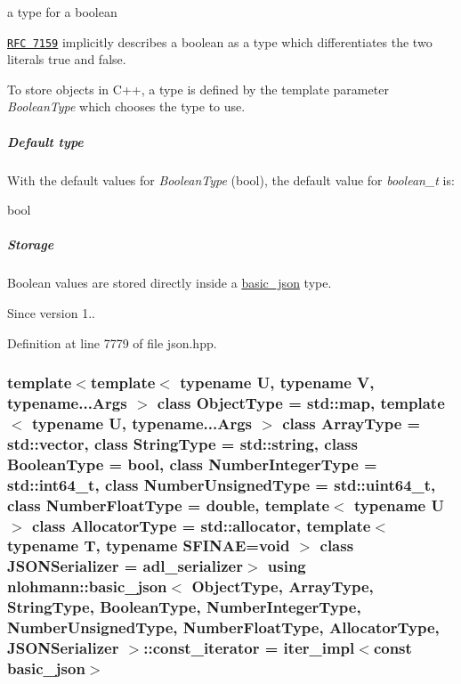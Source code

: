 a type for a boolean 

\href{http://rfc7159.net/rfc7159}{\tt R\+FC 7159} implicitly describes a boolean as a type which differentiates the two literals {\ttfamily true} and {\ttfamily false}.

To store objects in C++, a type is defined by the template parameter {\itshape Boolean\+Type} which chooses the type to use.

\subparagraph*{Default type}

With the default values for {\itshape Boolean\+Type} ({\ttfamily bool}), the default value for {\itshape boolean\+\_\+t} is\+:


\begin{DoxyCode}
\textcolor{keywordtype}{bool}
\end{DoxyCode}


\subparagraph*{Storage}

Boolean values are stored directly inside a \hyperlink{classnlohmann_1_1basic__json}{basic\+\_\+json} type.

\begin{DoxySince}{Since}
version 1.. 
\end{DoxySince}


Definition at line 7779 of file json.\+hpp.

\subsubsection[{\texorpdfstring{const\+\_\+iterator}{const_iterator}}]{\setlength{\rightskip}{0pt plus 5cm}template$<$template$<$ typename U, typename V, typename...\+Args $>$ class Object\+Type = std\+::map, template$<$ typename U, typename...\+Args $>$ class Array\+Type = std\+::vector, class String\+Type  = std\+::string, class Boolean\+Type  = bool, class Number\+Integer\+Type  = std\+::int64\+\_\+t, class Number\+Unsigned\+Type  = std\+::uint64\+\_\+t, class Number\+Float\+Type  = double, template$<$ typename U $>$ class Allocator\+Type = std\+::allocator, template$<$ typename T, typename S\+F\+I\+N\+A\+E=void $>$ class J\+S\+O\+N\+Serializer = adl\+\_\+serializer$>$ using {\bf nlohmann\+::basic\+\_\+json}$<$ Object\+Type, Array\+Type, String\+Type, Boolean\+Type, Number\+Integer\+Type, Number\+Unsigned\+Type, Number\+Float\+Type, Allocator\+Type, J\+S\+O\+N\+Serializer $>$\+::{\bf const\+\_\+iterator} =  {\bf iter\+\_\+impl}$<$const {\bf basic\+\_\+json}$>$}\hypertarget{classnlohmann_1_1basic__json_a41a70cf9993951836d129bb1c2b3126a}{}\label{classnlohmann_1_1basic__json_a41a70cf9993951836d129bb1c2b3126a}


